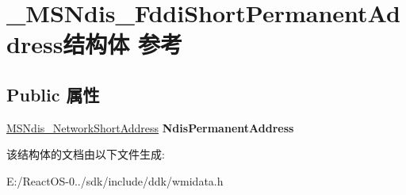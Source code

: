 \hypertarget{struct___m_s_ndis___fddi_short_permanent_address}{}\section{\+\_\+\+M\+S\+Ndis\+\_\+\+Fddi\+Short\+Permanent\+Address结构体 参考}
\label{struct___m_s_ndis___fddi_short_permanent_address}
\subsection*{Public 属性}
\begin{DoxyCompactItemize}
\item 
\mbox{\label{struct___m_s_ndis___fddi_short_permanent_address_ad4523ee8cd384a1ac5edbf2d10ccd20d}} 
\hyperlink{struct___m_s_ndis___network_short_address}{M\+S\+Ndis\+\_\+\+Network\+Short\+Address} {\bfseries Ndis\+Permanent\+Address}
\end{DoxyCompactItemize}


该结构体的文档由以下文件生成\+:\begin{DoxyCompactItemize}
\item 
E\+:/\+React\+O\+S-\/0../sdk/include/ddk/wmidata.\+h\end{DoxyCompactItemize}
